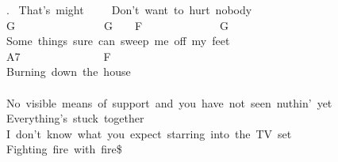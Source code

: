 {. \ That's\ might\ \ \ \ \ Don't\ want\ to\ hurt\ nobody\\
G\ \ \ \ \ \ \ \ \ \ \ \ \ \ \ \ G\ \ \ \ F\ \ \ \ \ \ \ \ \ \ \ \ \ \ G\\
Some\ things\ sure\ can\ sweep\ me\ off\ my\ feet\\
A7\ \ \ \ \ \ \ \ \ \ \ \ \ \ \ F\\
Burning\ down\ the\ house\\
\\
No\ visible\ means\ of\ support\ and\ you\ have\ not\ seen\ nuthin'\ yet\\
Everything's\ stuck\ together\\
I\ don't\ know\ what\ you\ expect\ starring\ into\ the\ TV\ set\\
Fighting\ fire\ with\ fire\$}
